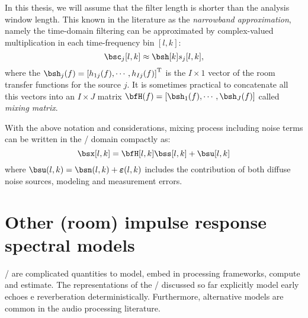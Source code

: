 In this thesis, we will assume that the filter length is shorter than the analysis window length.
This known in the literature as the \textit{narrowband approximation}, namely the time-domain filtering can be approximated by complex-valued multiplication in each time-frequency bin $[l,k]$:
\begin{equation}
    \imgs_j[l,k] \approx \bsh[k] \src_j[l,k]
    ,
\end{equation}
where the $\bsh_j(f) = \ktranspose{\klist{h_{1j}(f), \cdots, h_{Ij}(f)}}$ is the $I \times 1$ vector of the room transfer functions for the source $j$.
It is sometimes practical to concatenate all this vectors into an $I \times J$ matrix $\bfH(f) = \klist{\bsh_1(f),\cdots,\bsh_J(f)}$ called \textit{mixing matrix}.

With the above notation and considerations, mixing process including noise terms can be written in the \STFT/ domain compactly as:
\begin{equation}\label{eq:processing:model:stfs}
    \bsx[l,k] = \bfH[l,k] \bss[l,k] + \bsu[l,k]
\end{equation}
where $\bsu(l,k) = \bsn(l,k) + \boldsymbol{\varepsilon}(l,k)$ includes the contribution of both diffuse noise sources, modeling and measurement errors.



\section{Other (room) impulse response spectral models}
\RIRs/ are complicated quantities to model, embed in processing frameworks, compute and estimate.
The representations of the \RIR/ discussed so far explicitly model early echoes e reverberation deterministically.
Furthermore, alternative models are common in the audio processing literature.

